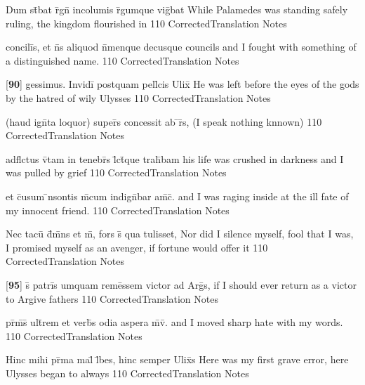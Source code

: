 \latline
  {Dum st\={}bat r\={}gn\={} incolumis r\={}gumque vig\={}bat}
  { While Palamedes was standing safely ruling, the kingdom flourished in }
  {110}
  { CorrectedTranslation }
  { Notes }


\latline
  {concili\={\macron {\i}}s, et n\={}s aliquod n\={}menque decusque}
  { councils and I fought with something of a distinguished name. }
  {110}
  { CorrectedTranslation }
  { Notes }


\latline
  {[\textbf{90}] gessimus.  Invidi\={} postquam pell\={}cis Ulix\={\macron {\i}}}
  { He was left before the eyes of the gods by the hatred of wily Ulysses }
  {110}
  { CorrectedTranslation }
  { Notes }


\latline
  {(haud ign\={}ta loquor) super\={\macron {\i}}s concessit ab \={}r\={\macron {\i}}s,}
  { (I speak nothing knnown) }
  {110}
  { CorrectedTranslation }
  { Notes }


\latline
  {adfl\={\macron {\i}}ctus v\={\macron {\i}}tam in tenebr\={\macron {\i}}s l\={}ct\={}que trah\={}bam}
  { his life was crushed in darkness and I was pulled by grief }
  {110}
  { CorrectedTranslation }
  { Notes }


\latline
  {et c\={}usum \={\macron {\i}}nsontis m\={}cum indign\={}bar am\={\macron {\i}}c\={\macron {\i}}.}
  { and I was raging inside at the ill fate of my innocent friend. }
  {110}
  { CorrectedTranslation }
  { Notes }


\latline
  {Nec tacu\={\macron {\i}} d\={}m\={}ns et m\={}, fors s\={\macron {\i}} qua tulisset,}
  { Nor did I silence myself, fool that I was, I promised myself as an avenger, if fortune would offer it }
  {110}
  { CorrectedTranslation }
  { Notes }


\latline
  {[\textbf{95}] s\={\macron {\i}} patri\={}s umquam reme\={}ssem victor ad Arg\={}s,}
  { if I should ever return as a victor to Argive fathers }
  {110}
  { CorrectedTranslation }
  { Notes }


\latline
  {pr\={}m\={\macron {\i}}s\={\macron {\i}} ult\={}rem et verb\={\macron {\i}}s odia aspera m\={}v\={\macron {\i}}.}
  { and I moved sharp hate with my words. }
  {110}
  { CorrectedTranslation }
  { Notes }


\latline
  {Hinc mihi pr\={\macron {\i}}ma mal\={\macron {\i}} l\={}bes, hinc semper Ulix\={}s}
  { Here was my first grave error, here Ulysses began to always }
  {110}
  { CorrectedTranslation }
  { Notes }


